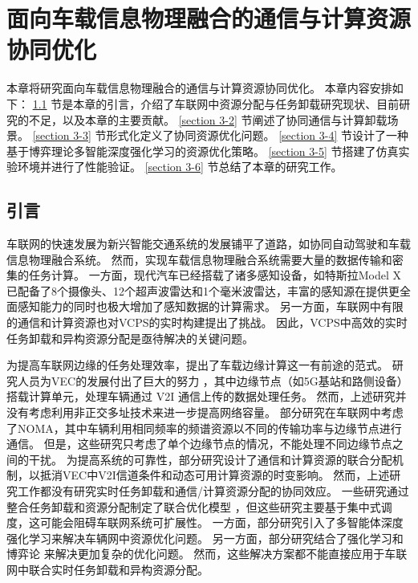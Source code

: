\chapter[\hspace{0pt}面向车载信息物理融合的通信与计算资源协同优化]{{\hspace{-5pt}面向车载信息物理融合的通信与计算资源协同优化}}
\removelofgap
\removelotgap
本章将研究面向车载信息物理融合的通信与计算资源协同优化。
本章内容安排如下：
\ref{section 3-1} 节是本章的引言，介绍了车联网中资源分配与任务卸载研究现状、目前研究的不足，以及本章的主要贡献。
\ref{section 3-2} 节阐述了协同通信与计算卸载场景。
\ref{section 3-3} 节形式化定义了协同资源优化问题。
\ref{section 3-4} 节设计了一种基于博弈理论多智能深度强化学习的资源优化策略。
\ref{section 3-5} 节搭建了仿真实验环境并进行了性能验证。
\ref{section 3-6} 节总结了本章的研究工作。

\section[\hspace{-2pt}引言]{{ \hspace{-8pt}引言}}\label{section 3-1}

车联网的快速发展为新兴智能交通系统的发展铺平了道路，如协同自动驾驶\cite{bagheri20215g}和车载信息物理融合系统\cite{mugabarigira2023context}。
然而，实现车载信息物理融合系统需要大量的数据传输和密集的任务计算。
一方面，现代汽车已经搭载了诸多感知设备，如特斯拉Model X已配备了8个摄像头、12个超声波雷达和1个毫米波雷达，丰富的感知源在提供更全面感知能力的同时也极大增加了感知数据的计算需求。
另一方面，车联网中有限的通信和计算资源也对VCPS的实时构建提出了挑战。
因此，VCPS中高效的实时任务卸载和异构资源分配是亟待解决的关键问题。

为提高车联网边缘的任务处理效率，提出了车载边缘计算\cite{lang2022cooperative}这一有前途的范式。
研究人员为VEC的发展付出了巨大的努力 \cite{liu2021fog, dai2021edge, zhang2022digital, liu2020adaptive, liu2018coding}，其中边缘节点（如5G基站和路侧设备）搭载计算单元，处理车辆通过 V2I 通信上传的数据处理任务。
然而，上述研究并没有考虑利用非正交多址\cite{islam2017power}技术来进一步提高网络容量。
部分研究在车联网中考虑了NOMA\cite{patel2021performance, zhang2021centralized, zhu2021decentralized, liu2019energy}，其中车辆利用相同频率的频谱资源以不同的传输功率与边缘节点进行通信。
但是，这些研究只考虑了单个边缘节点的情况，不能处理不同边缘节点之间的干扰。
为提高系统的可靠性，部分研究设计了通信和计算资源的联合分配机制，以抵消VEC中V2I信道条件和动态可用计算资源的时变影响\cite{liu2021rtds, liu2022a, chen2020robust, liu2014temporal, liu2016cooperative}。
然而，上述研究工作都没有研究实时任务卸载和通信/计算资源分配的协同效应。
一些研究通过整合任务卸载和资源分配制定了联合优化模型 \cite{dai2021asynchronous, dai2022a}，但这些研究主要基于集中式调度，这可能会阻碍车联网系统可扩展性。
一方面，部分研究引入了多智能体深度强化学习\cite{kumar2022multi}来解决车辆网中资源优化问题\cite{alam2022multi, zhang2021adaptive, nie2021semi}。
另一方面，部分研究结合了强化学习和博弈论 \cite{zheng2022stackelberg, albaba2021driver, rajeswaran2020a}来解决更加复杂的优化问题。
然而，这些解决方案都不能直接应用于车联网中联合实时任务卸载和异构资源分配。

